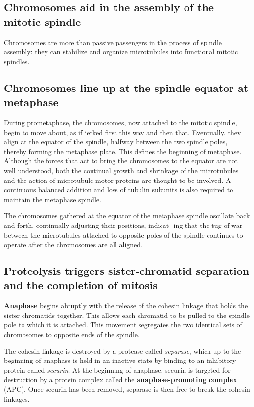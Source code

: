 \subsection{Chromosomes aid in the assembly of the mitotic spindle}

Chromosomes are more than passive passengers in the process of spindle
assembly: they can stabilize and organize microtubules into functional
mitotic spindles.

\subsection{Chromosomes line up at the spindle equator at metaphase}

During prometaphase, the chromosomes, now attached to the mitotic
spindle, begin to move about, as if jerked first this way and then that.
Eventually, they align at the equator of the spindle, halfway between the
two spindle poles, thereby forming the metaphase plate. This defines the
beginning of metaphase. Although the forces that act to
bring the chromosomes to the equator are not well understood, both the
continual growth and shrinkage of the microtubules and the action of
microtubule motor proteins are thought to be involved. A continuous balanced
addition and loss of tubulin subunits is also required to maintain
the metaphase spindle.

The chromosomes gathered at the equator of the metaphase spindle
oscillate back and forth, continually adjusting their positions, indicat-
ing that the tug-of-war between the microtubules attached to opposite
poles of the spindle continues to operate after the chromosomes are all
aligned.

\subsection{Proteolysis triggers sister-chromatid separation and the completion of mitosis}

\textbf{Anaphase} begins abruptly with the release of the cohesin linkage that
holds the sister chromatids together. This allows each
chromatid to be pulled to the spindle pole to which it is attached.
This movement segregates the two identical sets of chromosomes
to opposite ends of the spindle.

The cohesin linkage is destroyed by a protease called \textit{separase}, which up
to the beginning of anaphase is held in an inactive state by binding to an
inhibitory protein called \textit{securin}. At the beginning of anaphase, securin
is targeted for destruction by a protein complex called the \textbf{anaphase-promoting complex}
(APC). Once securin has been removed, separase is
then free to break the cohesin linkages.

